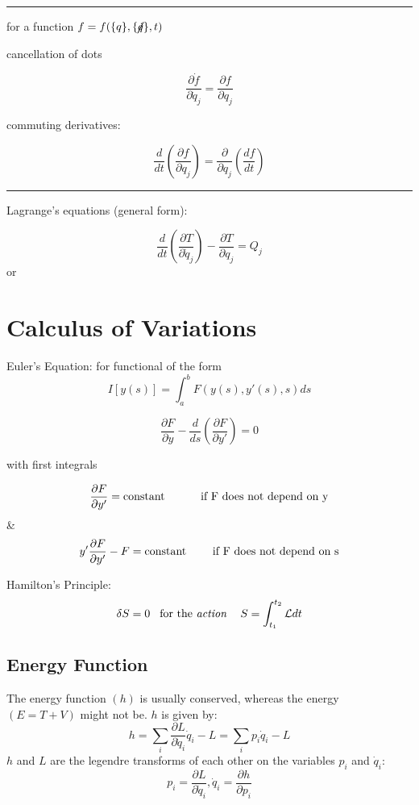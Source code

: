 \documentclass[table,cmyk]{article}
\newcommand{\Lagr}{\mathcal{L}}
\begin{document}
\begin{longtable}
\noindent\rule{7.8cm}{0.4pt}

for a function $f = f(\{q\},\{\cancel{\dot{q}}\},t)$

cancellation of dots

\[ \frac{\partial \dot{f}}{\partial \dot{q}_j} = \frac{\partial f}{\partial q_j}\]

commuting derivatives:

\[\frac{d}{dt}\left(\frac{\partial f}{\partial q_j} \right) = \frac{\partial}{\partial q_j}\left( \frac{df}{dt} \right)\]

\noindent\rule{7.8cm}{0.4pt}

Lagrange's equations (general form):

\[ \frac{d}{dt} \left( \frac{\partial T}{\partial \dot{q}_j} \right) - \frac{\partial T}{\partial q_j} = Q_j\]
or

\vspace{0.1cm}
\fbox{
\begin{minipage}{7.4cm}

\[\frac{d}{dt} \left( \frac{\partial \Lagr}{\partial q_j} \right) - \frac{\partial \Lagr}{\partial q_j} = 0\]

where $\Lagr(\{q\},\{\dot{q}\}.t) = T(\{q\}.\{\dot{q}\},t) - V(\{q\},t)$
\end{minipage}

}

\section*{Calculus of Variations}
Euler's Equation: for functional of the form
\[ I[y(s)] = \int_{a}^{b} F(y(s),y'(s),s)ds\]

\[ \frac{\partial F}{\partial y} - \frac{d}{ds} \left( \frac{\partial F}{\partial y'} \right) = 0 \]

with first integrals

\[\frac{\partial F}{\partial y'} = \text{constant} \text{\hspace{1cm} if F does not depend on y}\]
&
\[y'\frac{\partial F}{\partial y'} - F = \text{constant} \text{\hspace{0.7cm} if F does not depend on s}\]


Hamilton's Principle:
\[\delta S = 0 \text{\hspace{0.3cm}for the \textit{action} \hspace{0.3cm}} S = \int_{t_1}^{t_2} \Lagr dt \]
\subsection*{Energy Function}
  The energy function $(h)$ is usually conserved, whereas the energy $(E=T+V)$
  might not be. $h$ is given by:
  \begin{displaymath}
    h=\sum_i\frac{\partial L}{\partial \dot q_i}\dot q_i-L=\sum_ip_i\dot q_i-L
  \end{displaymath}
  $h$ and $L$ are the legendre transforms of each other on the variables $p_i$
  and $\dot q_i$:
  \begin{displaymath}
    p_i=\frac{\partial L}{\partial \dot q_i}, \dot q_i = \frac{\partial
      h}{\partial p_i}
  \end{displaymath}
\tabularnewline\hline

\end{longtable}
\end{document}

